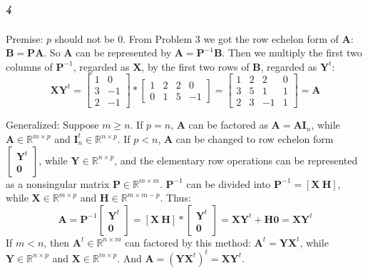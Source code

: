 \documentclass[22pt]{article}
\begin{document}
   	\subparagraph{4} Premise: $p$ should not be 0.
   	From Problem 3 we got the row echelon form of $\mathbf{A}$: $\mathbf{B} = \mathbf{PA}$. So $\mathbf{A}$ can be represented by $\mathbf{A} = \mathbf{P}^{-1}\mathbf{B}$. Then we multiply the first two columns of $\mathbf{P}^{-1}$, regarded as $\mathbf{X}$, by the first two rows of $\mathbf{B}$, regarded as $\mathbf{Y}^t$:
   	\begin{equation}
   		\mathbf{XY}^t = \left[ \begin{array}{cc} 1 & 0\\3 &-1\\2 & -1
   		\end{array}\right] * \left[ \begin{array}{cccc} 1 & 2 &2 &0\\0 & 1 &5&-1
   		\end{array}\right] = \left[ \begin{array}{cccc} 1 & 2 &2 &0\\3 & 5 &1&1\\2&3&-1&1 
   		\end{array}\right] = \mathbf{A}
   	\end{equation}

   	Generalized: Suppose $m\geq n$. If $p = n$, $\mathbf{A}$ can be factored as $\mathbf{A} = \mathbf{AI}_n$, while $\mathbf{A} \in \mathbb{R}^{m\times p}$ and $\mathbf{I}^t_n \in \mathbb{R}^{n\times p}$. If $p < n$, $\mathbf{A}$ can be changed to row echelon form $\left[ \begin{array}{c} \mathbf{Y}^t\\ \mathbf{0}
   		\end{array} \right]$, while $ \mathbf{Y} \in \mathbb{R}^{n\times p}$, and the elementary row operations can be represented as a nonsingular matrix $\mathbf{P} \in \mathbb{R}^{m\times m}$. $\mathbf{P}^{-1}$ can be divided into $\mathbf{P}^{-1} = [\mathbf{X}\ \mathbf{H}]$, while $ \mathbf{X} \in \mathbb{R}^{m\times p}$ and $ \mathbf{H} \in\mathbb{R}^{m\times m-p}$. Thus:
   		\begin{equation}
   			\mathbf{A} = \mathbf{P}^{-1}\left[ \begin{array}{c} \mathbf{Y}^t\\ \mathbf{0}
   		\end{array} \right] = [\mathbf{X}\ \mathbf{H}]*\left[ \begin{array}{c} \mathbf{Y}^t\\ \mathbf{0}
   		\end{array} \right] = \mathbf{XY}^t + \mathbf{H0}= \mathbf{XY}^t
   		\end{equation}
   		If $m<n$, then $\mathbf{A}^t \in \mathbb{R}^{n\times m}$ can factored by this method: $\mathbf{A}^t = \mathbf{YX}^t$, while $\mathbf{Y} \in \mathbb{R}^{n\times p}$ and $\mathbf{X} \in \mathbb{R}^{m\times p}$. And $\mathbf{A} = (\mathbf{YX}^t)^t = \mathbf{XY}^t$.
\end{document}
